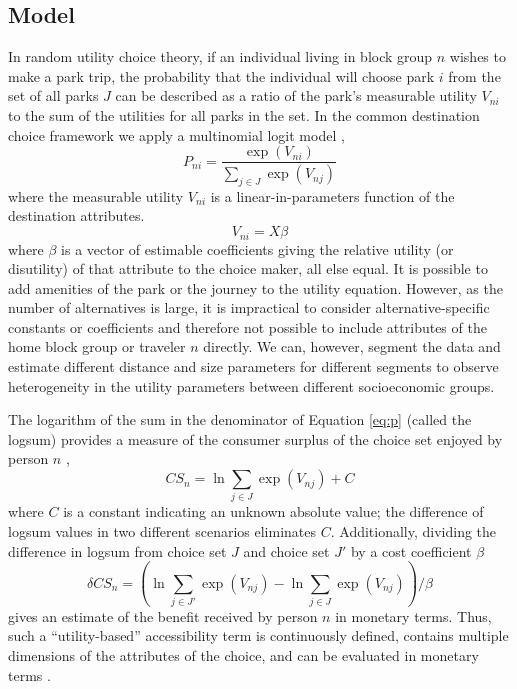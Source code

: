 \documentclass[3p, authoryear, review]{elsarticle} %
\begin{document}
\hypertarget{model}{%
\subsection{Model}\label{model}}

In random utility choice theory, if an individual living in block group \(n\)
wishes to make a park trip, the probability that the individual will choose
park \(i\) from the set of all parks \(J\) can be described as a ratio of the
park's measurable utility \(V_{ni}\) to the sum of the utilities for all parks
in the set. In the common destination choice framework we apply a
multinomial logit model \citep[\citet{Recker1978}]{McFadden1974},
\begin{equation}\label{eq:p}
   P_{ni} = \frac{\exp(V_{ni})}{\sum_{j \in J}\exp(V_{nj})}
\end{equation}
where the measurable utility \(V_{ni}\) is a linear-in-parameters function of
the destination attributes.
\begin{equation}\label{eq:V}
V_{ni} = X\beta
\end{equation}
where \(\beta\) is a vector of estimable coefficients giving the relative utility
(or disutility) of that attribute to the choice maker, all else equal. It is
possible to add amenities of the park or the journey to the utility
equation. However, as the number of alternatives is large, it is impractical to
consider alternative-specific constants or coefficients and therefore not
possible to include attributes of the home block group or traveler \(n\) directly.
We can, however, segment the data and estimate different distance and size
parameters for different segments to observe heterogeneity in the utility
parameters between different socioeconomic groups.

The logarithm of the sum in the denominator of Equation \ref{eq:p} (called the
logsum) provides a measure of the consumer surplus of the choice set enjoyed by
person \(n\)
\citep{Williams1977a},
\begin{equation}
CS_n = \ln{{\sum_{j \in J}\exp(V_{nj})}} + C
  \label{eq:logsum}
\end{equation}
where \(C\) is a constant indicating an unknown absolute value; the difference of
logsum values in two different scenarios eliminates \(C\). Additionally,
dividing the difference in logsum from choice set \(J\) and choice set \(J'\) by a
cost coefficient \(\beta\)
\begin{equation}
\delta CS_n = (\ln{\sum_{j \in J'}\exp(V_{nj})} - \ln{\sum_{j \in J}\exp(V_{nj})})/\beta
  \label{eq:deltalogsum}
\end{equation}
gives an estimate of the benefit received by person \(n\) in monetary terms.
Thus, such a ``utility-based'' accessibility term is continuously defined, contains
multiple dimensions of the attributes of the choice, and can be evaluated
in monetary terms \citep{Handy1997, Dong2006}.
\end{document}
